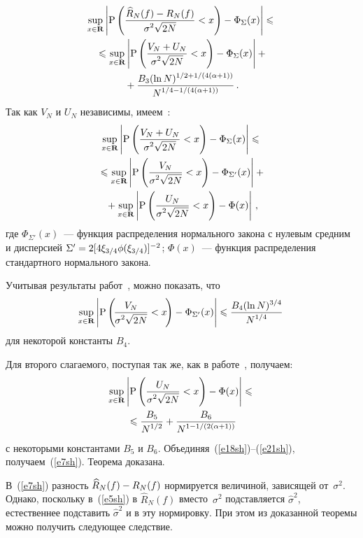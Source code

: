 \begin{multicols}{2}
\noindent
\begin{multline}
\sup\limits_{x\in\mathbf{R}}\left\vert\mbox{P}\left
(\displaystyle\frac{\displaystyle \widehat{R}_N(f)-R_N(f)\mathstrut}{\displaystyle \sigma^2\sqrt{2N}\mathstrut}<x\right)-\Phi_\Sigma(x)\right\vert\leqslant{}\\
{}\leqslant\sup\limits_{x\in\mathbf{R}}\left\vert\mbox{P}\left(
\displaystyle\frac{\displaystyle V_N+U_N\mathstrut}{\displaystyle \sigma^2\sqrt{2N}\mathstrut}<x\right)-\Phi_\Sigma(x)\right\vert+{}\\
{}+
\displaystyle\frac{\displaystyle B_3(\ln N)^{{1}/{2}+{1}/(4(\alpha+1))}\mathstrut}{\displaystyle N^{{1}/{4}-{1}/(4(\alpha+1))}\mathstrut}\,.
\label{e18sh}
\end{multline}
Так как $V_N$ и $U_N$ независимы, имеем~\cite{19sh}:
\begin{multline}
\sup\limits_{x\in\mathbf{R}}\left\vert\mbox{P}\left(
\displaystyle\frac{\displaystyle V_N+U_N\mathstrut}{\displaystyle \sigma^2\sqrt{2N}\mathstrut}<x\right)-\Phi_\Sigma(x)\right\vert\leqslant{}\\
{}\leqslant\sup\limits_{x\in\mathbf{R}}\left\vert\mbox{P}\left(
\displaystyle\frac{\displaystyle V_N\mathstrut}{\displaystyle \sigma^2\sqrt{2N}\mathstrut}<x\right)-\Phi_{\Sigma'}(x)\right\vert+{}\\
{}+
\sup\limits_{x\in\mathbf{R}}\left\vert\mbox{P}\left(
\displaystyle\frac{\displaystyle U_N\mathstrut}{\displaystyle \sigma^2\sqrt{2N}\mathstrut}<x\right)-\Phi(x)\right\vert\,,\label{e19sh}
\end{multline}
где $\Phi_{\Sigma'}(x)$~--- функция распределения нормального закона с нулевым средним 
и дисперсией $\Sigma'\hm=2[4\xi_{3/4}\phi(\xi_{3/4})]^{-2}$; $\Phi(x)$~--- 
функция распределения стандартного нормального закона.

Учитывая результаты работ~\cite{12sh, 16sh}, можно показать, что
\begin{equation}
\hspace*{-2mm}\sup\limits_{x\in\mathbf{R}}\abs{\mbox{P}\left(\!
\fr{V_N}{\sigma^2\sqrt{2N}}<x\!\right)-\Phi_{\Sigma'}(x)}\leqslant
\fr{B_4(\ln N)^{{3}/{4}}}{N^{{1}/{4}}}\!\!\label{e20sh}
\end{equation}
для некоторой константы $B_4$.

Для второго слагаемого, поступая так же, как в работе~\cite{8sh}, получаем:
\begin{multline}
\sup\limits_{x\in\mathbf{R}}\left\vert\mbox{P}\left(
\displaystyle\frac{\displaystyle U_N\mathstrut}{\displaystyle \sigma^2\sqrt{2N}\mathstrut}<x\right)-\Phi(x)\right\vert\leqslant{}\\
{}\leqslant
\displaystyle\frac{\displaystyle B_5\mathstrut}{\displaystyle N^{{1}/{2}}\mathstrut}+\displaystyle\frac{\displaystyle B_6\mathstrut}{\displaystyle N^{1-1/(2(\alpha+1))}\mathstrut}\label{e21sh}
\end{multline}
с некоторыми константами $B_5$ и $B_6$.
Объединяя~(\ref{e18sh})--(\ref{e21sh}), получаем~(\ref{e7sh}). 
Теорема доказана.

\smallskip

В~(\ref{e7sh}) разность $\widehat{R}_N(f)\hm-R_N(f)$ нормируется величиной, зависящей 
от~$\sigma^2$. Однако, поскольку в~(\ref{e5sh}) в $\widehat{R}_N(f)$ вместо~$\sigma^2$ 
подставляется $\hat{\sigma}^2$, естественнее подставить $\hat{\sigma}^2$ и в эту нормировку. 
При этом из доказанной теоремы можно получить следующее следствие.


\end{multicols}
